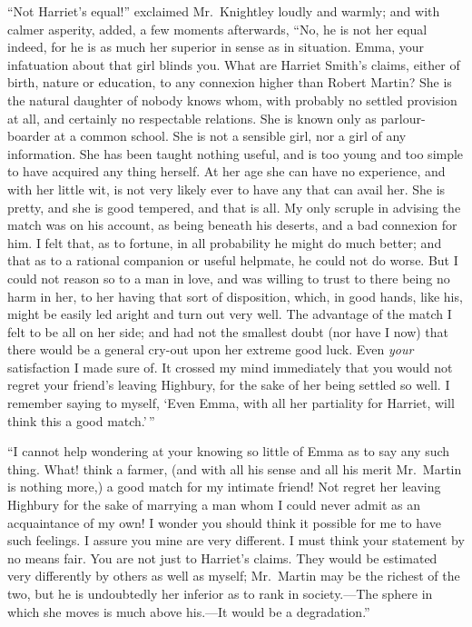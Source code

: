 ``Not Harriet's equal!'' exclaimed Mr.\ Knightley loudly and warmly;
and with calmer asperity, added, a few moments afterwards, ``No, he
is not her equal indeed, for he is as much her superior in sense
as in situation.  Emma, your infatuation about that girl blinds you.
What are Harriet Smith's claims, either of birth, nature or education,
to any connexion higher than Robert Martin? She is the natural
daughter of nobody knows whom, with probably no settled provision
at all, and certainly no respectable relations.  She is known only
as parlour-boarder at a common school.  She is not a sensible girl,
nor a girl of any information.  She has been taught nothing useful,
and is too young and too simple to have acquired any thing herself.
At her age she can have no experience, and with her little wit,
is not very likely ever to have any that can avail her.
She is pretty, and she is good tempered, and that is all.
My only scruple in advising the match was on his account, as being
beneath his deserts, and a bad connexion for him.  I felt that,
as to fortune, in all probability he might do much better; and that as
to a rational companion or useful helpmate, he could not do worse.
But I could not reason so to a man in love, and was willing
to trust to there being no harm in her, to her having that sort
of disposition, which, in good hands, like his, might be easily led
aright and turn out very well.  The advantage of the match I felt
to be all on her side; and had not the smallest doubt (nor have I now)
that there would be a general cry-out upon her extreme good luck.
Even \emph{your} satisfaction I made sure of.  It crossed my mind immediately
that you would not regret your friend's leaving Highbury, for the
sake of her being settled so well.  I remember saying to myself,
`Even Emma, with all her partiality for Harriet, will think this a
good match.'\,''

``I cannot help wondering at your knowing so little of Emma as to say
any such thing.  What! think a farmer, (and with all his sense and all
his merit Mr.\ Martin is nothing more,) a good match for my intimate
friend! Not regret her leaving Highbury for the sake of marrying
a man whom I could never admit as an acquaintance of my own! I
wonder you should think it possible for me to have such feelings.
I assure you mine are very different.  I must think your statement
by no means fair.  You are not just to Harriet's claims.
They would be estimated very differently by others as well as myself;
Mr.\ Martin may be the richest of the two, but he is undoubtedly
her inferior as to rank in society.---The sphere in which she moves
is much above his.---It would be a degradation.''

